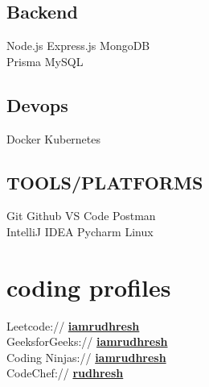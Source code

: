 \begin{minipage}[t]{0.33\textwidth}
\vspace{\topsep} %

\subsection{Backend}
\textbullet{} Node.js
\textbullet{} Express.js
\textbullet{} MongoDB \\
\textbullet{} Prisma
\textbullet{} MySQL

\vspace{\topsep} %

\subsection{Devops}
\textbullet{} Docker
\textbullet{} Kubernetes


\vspace{\topsep} %

\subsection{TOOLS/PLATFORMS}
\textbullet{} Git
\textbullet{} Github
\textbullet{} VS Code  
\textbullet{} Postman \\
\textbullet{} IntelliJ IDEA
\textbullet{} Pycharm  
\textbullet{} Linux


\vspace{\topsep} %


\section{coding profiles} 
Leetcode:// \href{https://leetcode.com/iamrudhresh/}{\bf iamrudhresh} \\
GeeksforGeeks:// \href{https://auth.geeksforgeeks.org/user/iamrudhresh}{\bf iamrudhresh} \\

Coding Ninjas:// \href{https://www.codingninjas.com/studio/profile/iamrudhresh}{\bf iamrudhresh} \\
CodeChef:// \href{https://www.codechef.com/users/rudhresh}{\bf rudhresh} \\


\end{minipage}
